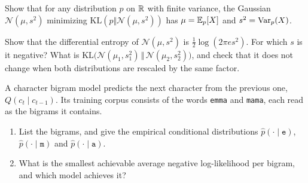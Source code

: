 \begin{notechapter}
\begin{exercise}\label{cross-entropy:exr:moments}
Show that for any distribution $p$ on $\mathbb{R}$ with finite variance, the Gaussian
$\mathcal N(\mu, s^2)$ minimizing $\mathrm{KL}(p\Vert\mathcal N(\mu, s^2))$ has $\mu = \mathbb{E}_p[X]$ and $s^2 = \operatorname{Var}_p(X)$.
\end{exercise}

\begin{exercise}\label{cross-entropy:exr:3}
Show that the differential entropy of $\mathcal N(\mu, s^2)$ is $\frac12\log(2\pi es^2)$. For which
$s$ is it negative? What is $\mathrm{KL}\bigl(\mathcal N(\mu_1, s_1^2)\,\Vert\,\mathcal N(\mu_2, s_2^2)\bigr)$, and check
that it does not change when both distributions are rescaled by the same factor.
\end{exercise}

\begin{exercise}\label{cross-entropy:exr:4}
A character bigram model predicts the next character from the previous one,
$Q(c_t\mid c_{t-1})$. Its training corpus consists of the words \texttt{emma} and
\texttt{mama}, each read as the bigrams it contains.
\begin{enumerate}[nosep]
  \item List the bigrams, and give the empirical conditional distributions
        $\hat p(\cdot\mid\texttt e)$, $\hat p(\cdot\mid\texttt m)$ and $\hat p(\cdot\mid\texttt a)$.
  \item What is the smallest achievable average negative log-likelihood per bigram,
        and which model achieves it?
\end{enumerate}
\end{exercise}
\end{notechapter}
